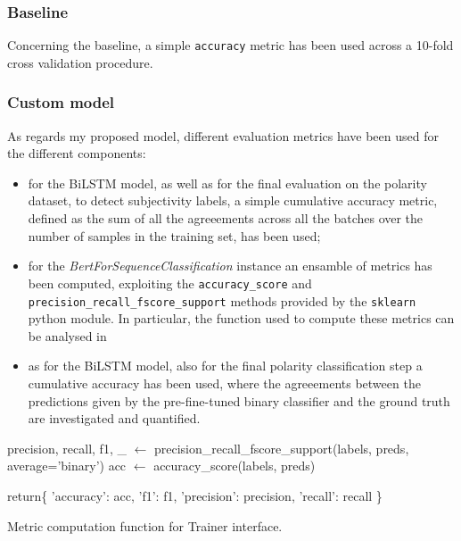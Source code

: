 \subsubsection{Baseline}
Concerning the baseline, a simple \texttt{accuracy} metric has been used across a 10-fold cross validation procedure.
\subsubsection{Custom model}
As regards my proposed model, different evaluation metrics have been used for the different components:
\begin{itemize}
    \item for the BiLSTM model, as well as for the final evaluation on the polarity dataset, to detect subjectivity labels, a simple cumulative accuracy metric, defined as the sum of all the agreeements
    across all the batches over the number of samples in the training set, has been used;
    \item for the \textit{BertForSequenceClassification} instance an ensamble of metrics has been computed, exploiting the 
    \texttt{accuracy\_score} and \texttt{precision\_recall\_fscore\_support} methods provided by the \texttt{sklearn} python module. 
    In particular, the function used to compute these metrics can be analysed in \textbf{}
    \item as for the BiLSTM model, also for the final polarity classification step a cumulative accuracy has been used, where the agreeements
    between the predictions given by the pre-fine-tuned binary classifier and the ground truth are investigated and quantified.
\end{itemize}


\begin{algorithm}
    \SetAlgoLined
    \DontPrintSemicolon
    \CommentSty{\color{blue}}
    precision, recall, f1, \_  $\gets$ precision\_recall\_fscore\_support(labels, preds, average='binary')\;
    acc $\gets$ accuracy\_score(labels, preds)\;

    return\{\;
            \hspace{5mm}'accuracy': acc,\;
            \hspace{5mm}'f1': f1,\;
            \hspace{5mm}'precision': precision,\;
            \hspace{5mm}'recall': recall\;
        \}

\caption{Metric computation function for Trainer interface.}
\label{alg:binaryclf}

\end{algorithm}

